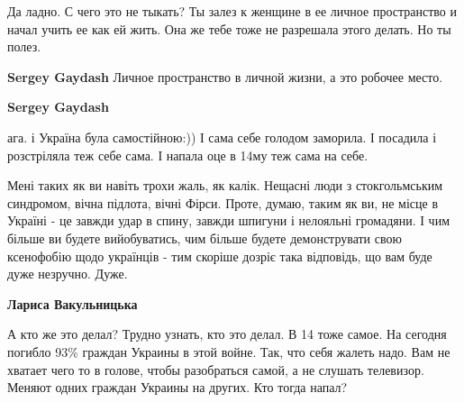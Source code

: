 \begin{itemize}
\begin{itemize}
Да ладно. С чего это не тыкать? Ты залез к женщине в ее личное пространство и
начал учить ее как ей жить. Она же тебе тоже не разрешала этого делать. Но ты
полез.

 
\textbf{Sergey Gaydash}
Личное пространство в личной жизни, а это робочее место.

 
\textbf{Sergey Gaydash} 

ага. і Україна була самостійною:)) І сама себе голодом заморила. І посадила і
розстріляла теж себе сама. І напала оце в 14му теж сама на себе.

Мені таких як ви навіть трохи жаль, як калік. Нещасні люди з стокгольмським
синдромом, вічна підлота, вічні Фірси. Проте, думаю, таким як ви, не місце в
Україні - це завжди удар в спину, завжди шпигуни і нелояльні громадяни. І чим
більше ви будете вийобуватись, чим більше будете демонструвати свою ксенофобію
щодо українців - тим скоріше дозріє така відповідь, що вам буде дуже незручно.
Дуже.

 
\textbf{Лариса Вакульницька} 

А кто же это делал? Трудно узнать, кто это делал. В 14 тоже самое. На сегодня
погибло 93\% граждан Украины в этой войне. Так, что себя жалеть надо. Вам не
хватает чего то в голове, чтобы разобраться самой, а не слушать телевизор.
Меняют одних граждан Украины на других. Кто тогда напал?


 

\end{itemize}
\end{itemize}
